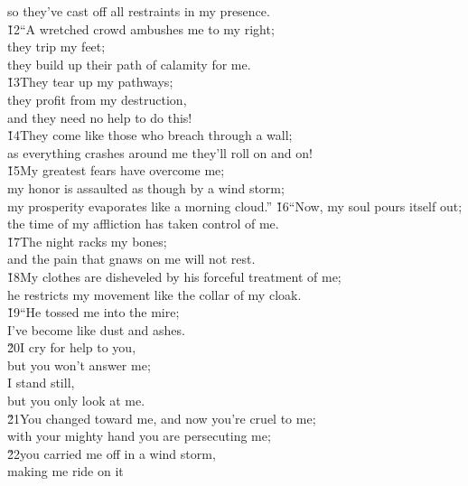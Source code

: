 \begin{poetry}
\poemll    so they've cast off all restraints in my presence. \\
\poeml \v{12}``A wretched crowd ambushes me to my right; \\
\poemll    they trip my feet; \\
\poemlll       they build up their path of calamity for me. \\
\poeml \v{13}They tear up my pathways; \\
\poemll    they profit from my destruction, \\
\poemlll       and they need no help to do this! \\
\poeml \v{14}They come like those who breach through a wall; \\
\poemll    as everything crashes around me they'll roll on and on! \\
\poeml \v{15}My greatest fears have overcome me; \\
\poemll    my honor is assaulted as though by a wind storm; \\
\poemlll       my prosperity evaporates like a morning cloud.''
\poeml \v{16}``Now, my soul pours itself out; \\
\poemll    the time of my affliction has taken control of me. \\
\poeml \v{17}The night racks my bones; \\
\poemll    and the pain that gnaws on me will not rest. \\
\poeml \v{18}My clothes are disheveled by his forceful treatment of me; \\
\poemll    he restricts my movement like the collar of my cloak. \\
\poeml \v{19}``He tossed me into the mire; \\
\poemll    I've become like dust and ashes. \\
\poeml \v{20}I cry for help to you, \\
\poemll    but you won't answer me; \\
\poeml I stand still, \\
\poemll    but you only look at me. \\
\poeml \v{21}You changed toward me, and now you're cruel to me; \\
\poemll    with your mighty hand you are persecuting me; \\
\poeml \v{22}you carried me off in a wind storm, \\
\poemll    making me ride on it \\

\end{poetry}

